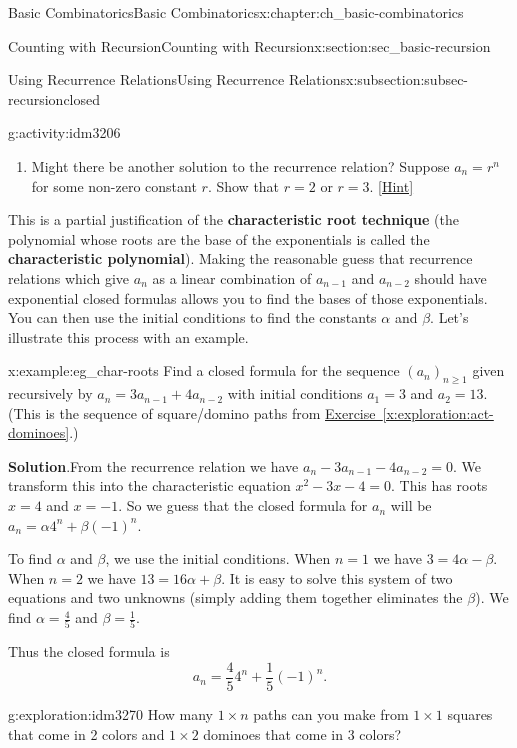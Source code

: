\documentclass[oneside,10pt,]{book}
\newcommand{\terminology}[1]{\textbf{#1}}
\numberwithin{equation}{chapter}
\begin{document}
\begin{chapterptx}{Basic Combinatorics}{}{Basic Combinatorics}{}{}{x:chapter:ch_basic-combinatorics}
\begin{sectionptx}{Counting with Recursion}{}{Counting with Recursion}{}{}{x:section:sec_basic-recursion}
\begin{subsectionptx}{Using Recurrence Relations}{}{Using Recurrence Relations}{}{}{x:subsection:subsec-recursionclosed}
\begin{activity}{}{g:activity:idm3206}
\begin{enumerate}[font=\bfseries,label=(\alph*),ref=\alph*]
\item{}Might there be another solution to the recurrence relation?  Suppose \(a_n = r^n\) for some non-zero constant \(r\).  Show that \(r = 2\) or \(r = 3\).%
\space\hspace*{0pt}\hfill{\tiny\hyperlink{g:hint:idm3230-back}{[Hint]}}\end{enumerate}
\end{activity}
This is a partial justification of the \terminology{characteristic root technique} (the polynomial whose roots are the base of the exponentials is called the \terminology{characteristic polynomial}).  Making the reasonable guess that recurrence relations which give \(a_n\) as a linear combination of \(a_{n-1}\) and \(a_{n-2}\) should have exponential closed formulas allows you to find the bases of those exponentials.  You can then use the initial conditions to find the constants \(\alpha\) and \(\beta\).  Let's illustrate this process with an example.%
\begin{example}{}{x:example:eg_char-roots}%
Find a closed formula for the sequence \((a_n)_{n \ge 1}\) given recursively by \(a_n = 3a_{n-1} + 4a_{n-2}\) with initial conditions \(a_1 = 3\) and \(a_2 = 13\).  (This is the sequence of square\slash{}domino paths from \hyperref[x:exploration:act-dominoes]{Exercise~\ref{x:exploration:act-dominoes}}.)%
\par\smallskip%
\noindent\textbf{Solution}.\hypertarget{g:solution:idm3250}{}\quad{}From the recurrence relation we have \(a_n - 3a_{n-1} - 4a_{n-2} = 0\).  We transform this into the characteristic equation \(x^2 - 3x - 4 = 0\). This has roots \(x = 4\) and \(x = -1\).  So we guess that the closed formula for \(a_n\) will be \(a_n = \alpha 4^n + \beta (-1)^n\).%
\par
To find \(\alpha\) and \(\beta\), we use the initial conditions.   When \(n = 1\) we have \(3 = 4\alpha -\beta\).  When \(n = 2\) we have \(13 = 16\alpha + \beta\).  It is easy to solve this system of two equations and two unknowns (simply adding them together eliminates the \(\beta\)).  We find \(\alpha = \frac{4}{5}\) and \(\beta = \frac{1}{5}\).%
\par
Thus the closed formula is%
\begin{equation*}
a_n = \frac{4}{5} 4^n + \frac{1}{5} (-1)^n\text{.}
\end{equation*}
%
\end{example}
\begin{exploration}{}{g:exploration:idm3270}%
How many \(1\times n\) paths can you make from \(1\times 1\) squares that come in 2 colors and \(1\times 2\) dominoes that come in 3 colors?%

\end{exploration}
\end{subsectionptx}
\end{sectionptx}
\end{chapterptx}
\end{document}
